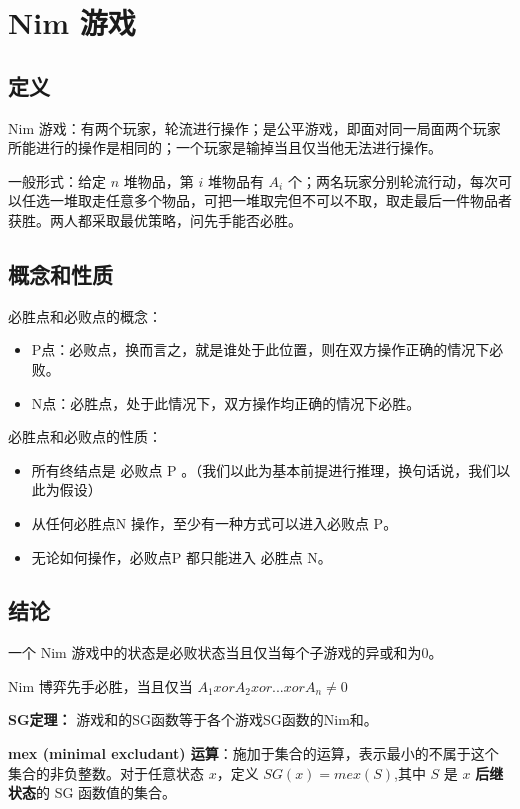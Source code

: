\section{Nim 游戏}
\subsection{定义}
\noindent\par Nim 游戏：有两个玩家，轮流进行操作；是公平游戏，即面对同一局面两个玩家所能进行的操作是相同的；一个玩家是输掉当且仅当他无法进行操作。
\noindent\par 一般形式：给定 $n$ 堆物品，第 $i$ 堆物品有 $A_i$ 个；两名玩家分别轮流行动，每次可以任选一堆取走任意多个物品，可把一堆取完但不可以不取，取走最后一件物品者获胜。两人都采取最优策略，问先手能否必胜。

\subsection{概念和性质}
\noindent\par 必胜点和必败点的概念：
\begin{itemize}
    \item P点：必败点，换而言之，就是谁处于此位置，则在双方操作正确的情况下必败。
    \item N点：必胜点，处于此情况下，双方操作均正确的情况下必胜。
\end{itemize}
\noindent\par 必胜点和必败点的性质：
\begin{itemize}
    \item 所有终结点是 必败点 P 。（我们以此为基本前提进行推理，换句话说，我们以此为假设）
    \item 从任何必胜点N 操作，至少有一种方式可以进入必败点 P。
    \item 无论如何操作，必败点P 都只能进入 必胜点 N。
\end{itemize}

\subsection{结论}
\noindent\par 一个 Nim 游戏中的状态是必败状态当且仅当每个子游戏的异或和为0。
\noindent\par Nim 博弈先手必胜，当且仅当 $A_1 xor A_2 xor ... xor A_n \neq 0$ 
\noindent\par \textbf{SG定理：} 游戏和的SG函数等于各个游戏SG函数的Nim和。
\noindent\par \textbf{mex (minimal excludant) 运算}：施加于集合的运算，表示最小的不属于这个集合的非负整数。对于任意状态 $x$，定义 $SG(x) = mex(S)$,其中 $S$ 是 $x$ \textbf{后继状态}的 SG 函数值的集合。

